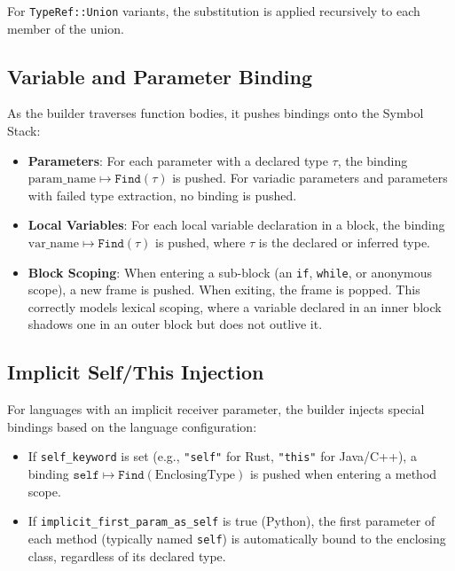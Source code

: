 For \texttt{TypeRef::Union} variants, the substitution is applied
recursively to each member of the union.

\subsection{Variable and Parameter Binding}

As the builder traverses function bodies, it pushes bindings onto the
Symbol Stack:

\begin{itemize}
  \item \textbf{Parameters}: For each parameter with a declared type
    $\tau$, the binding $\text{param\_name} \mapsto
    \texttt{Find}(\tau)$ is pushed. For variadic parameters and
    parameters with failed type extraction, no binding is pushed.
  \item \textbf{Local Variables}: For each local variable declaration
    in a block, the binding $\text{var\_name} \mapsto
    \texttt{Find}(\tau)$ is pushed, where $\tau$ is the declared or
    inferred type.
  \item \textbf{Block Scoping}: When entering a sub-block (an
    \texttt{if}, \texttt{while}, or anonymous scope), a new frame is
    pushed. When exiting, the frame is popped. This correctly models
    lexical scoping, where a variable declared in an inner block
    shadows one in an outer block but does not outlive it.
\end{itemize}

\subsection{Implicit Self/This Injection}

For languages with an implicit receiver parameter, the builder
injects special bindings based on the language configuration:
\begin{itemize}
  \item If \texttt{self\_keyword} is set (e.g., \texttt{"self"} for
    Rust, \texttt{"this"} for Java/C++), a binding $\texttt{self}
    \mapsto \texttt{Find}(\text{EnclosingType})$ is pushed when
    entering a method scope.
  \item If \texttt{implicit\_first\_param\_as\_self} is true
    (Python), the first parameter of each method (typically named
    \texttt{self}) is automatically bound to the enclosing class,
    regardless of its declared type.
\end{itemize}

